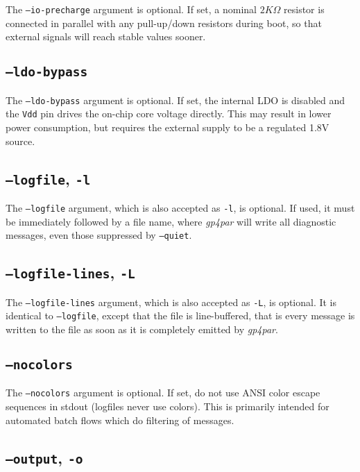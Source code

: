 \documentclass[11pt]{article}
\newcommand{\namestyle}[1]{\textit{#1}}
\newcommand{\tokenstyle}[1]{\texttt{#1}}
\begin{document}
The \texttt{--io-precharge} argument is optional. If set, a nominal $2K \Omega$ resistor is connected in parallel with any
pull-up/down resistors during boot, so that external signals will reach stable values sooner.

\subsection{\texttt{--ldo-bypass}}

The \texttt{--ldo-bypass} argument is optional. If set, the internal LDO is disabled and the \tokenstyle{Vdd} pin drives the
on-chip core voltage directly. This may result in lower power consumption, but requires the external supply to be a regulated
1.8V source.

\subsection{\texttt{--logfile}, \texttt{-l}}

The \texttt{--logfile} argument, which is also accepted as \texttt{-l}, is optional. If used, it must be immediately
followed by a file name, where \namestyle{gp4par} will write all diagnostic messages, even those suppressed by
\texttt{--quiet}.

\subsection{\texttt{--logfile-lines}, \texttt{-L}}

The \texttt{--logfile-lines} argument, which is also accepted as \texttt{-L}, is optional. It is identical to
\texttt{--logfile}, except that the file is line-buffered, that is every message is written to the file as soon
as it is completely emitted by \namestyle{gp4par}.

\subsection{\texttt{--nocolors}}

The \texttt{--nocolors} argument is optional. If set, do not use ANSI color escape sequences in stdout (logfiles never use
colors). This is primarily intended for automated batch flows which do filtering of messages.

\subsection{\texttt{--output}, \texttt{-o}}
\end{document}
